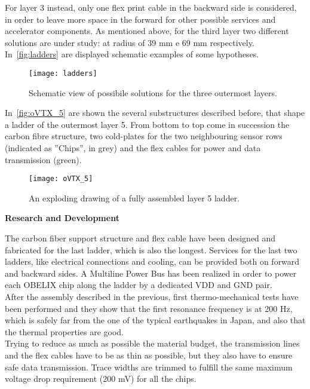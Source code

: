 For layer 3 instead, only one flex print cable in the backward side is considered, in order to leave more space in the forward for other possible services and accelerator components. As mentioned above, for the third layer two different solutions are under study: at radius of 39 mm e 69 mm respectively. 
In~\autoref{fig:ladders} are displayed schematic examples of some hypotheses. 

\begin{figure}[h!]
\centering
\texttt{[image: ladders]}
\caption{Schematic view of possibile solutions for the three outermost layers.}
\label{fig:ladders}
\end{figure}


In~\autoref{fig:oVTX_5} are shown the several substructures described before, that shape a ladder of the outermost layer 5. From bottom to top come in succession the carbon fibre structure, two cold-plates for the two neighbouring sensor rows (indicated as ''Chips'', in grey) and the flex cables for power and data transmission (green). 


\begin{figure}[h!]
\centering
\texttt{[image: oVTX\_5]}
\caption{An exploding drawing of a fully assembled layer 5 ladder.}
\label{fig:oVTX_5}
\end{figure}

\begin{description}
\item \textbf{Research and Development}
\end{description}

The carbon fiber support structure and flex cable have been designed and fabricated for the last ladder, which is also the longest. Services for the last two ladders, like electrical connections and cooling, can be provided both on forward and backward sides.
A Multiline Power Bus has been realized in order to power each OBELIX chip along the ladder by a dedicated VDD and GND pair. \\

After the assembly described in the previous, first thermo-mechanical tests have been performed and they show that the first resonance frequency is at 200 Hz, which is safely far from the one of the typical earthquakes in Japan, and also that the thermal properties are good.\\

Trying to reduce as much as possible the material budget, the transmission lines and the flex cables have to be as thin as possible, but they also have to ensure safe data transmission. Trace widths are trimmed to fulfill the same maximum voltage drop requirement (200 mV) for all the chips.

